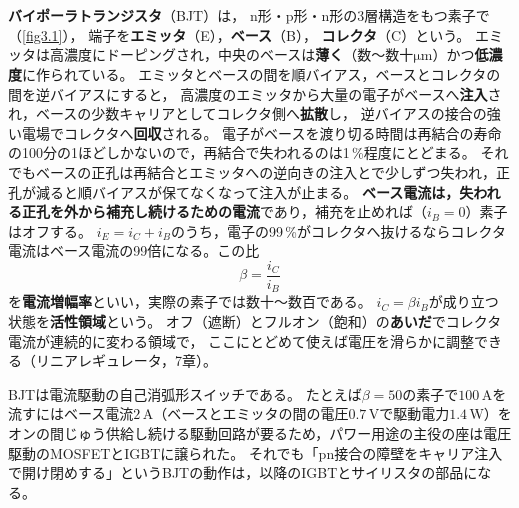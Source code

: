 \section{}
\label{sec3.3}

\textbf{バイポーラトランジスタ}（BJT）は，
n形・p形・n形の3層構造をもつ素子で（\ref{fig3.1}），
端子を\textbf{エミッタ}（E），\textbf{ベース}（B），
\textbf{コレクタ}（C）という。
エミッタは高濃度にドーピングされ，中央のベースは\textbf{薄く}（数〜数十$\mathrm{\mu m}$）かつ\textbf{低濃度}に作られている。
エミッタとベースの間を順バイアス，ベースとコレクタの間を逆バイアスにすると，
高濃度のエミッタから大量の電子がベースへ\textbf{注入}され，ベースの少数キャリアとしてコレクタ側へ\textbf{拡散}し，
逆バイアスの接合の強い電場でコレクタへ\textbf{回収}される。
電子がベースを渡り切る時間は再結合の寿命の100分の1ほどしかないので，再結合で失われるのは1\,\%程度にとどまる。
それでもベースの正孔は再結合とエミッタへの逆向きの注入とで少しずつ失われ，正孔が減ると順バイアスが保てなくなって注入が止まる。
\textbf{ベース電流は，失われる正孔を外から補充し続けるための電流}であり，補充を止めれば（$i_B = 0$）素子はオフする。
$i_E = i_C + i_B$のうち，電子の99\,\%がコレクタへ抜けるならコレクタ電流はベース電流の99倍になる。この比
\begin{equation}
\beta = \frac{i_C}{i_B}
\label{eq3.4}
\end{equation}
を\textbf{電流増幅率}といい，実際の素子では数十〜数百である。
$i_C = \beta i_B$が成り立つ状態を\textbf{活性領域}という。
オフ（遮断）とフルオン（飽和）の\textbf{あいだ}でコレクタ電流が連続的に変わる領域で，
ここにとどめて使えば電圧を滑らかに調整できる（リニアレギュレータ，7章）。

BJTは電流駆動の自己消弧形スイッチである。
たとえば$\beta = 50$の素子で$100$\,Aを流すにはベース電流$2$\,A（ベースとエミッタの間の電圧$0.7$\,Vで駆動電力$1.4$\,W）を
オンの間じゅう供給し続ける駆動回路が要るため，パワー用途の主役の座は電圧駆動のMOSFETとIGBTに譲られた。
それでも「pn接合の障壁をキャリア注入で開け閉めする」というBJTの動作は，以降のIGBTとサイリスタの部品になる。

\section{}
\label{sec3.4}

